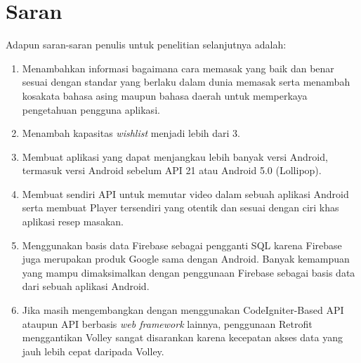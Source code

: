 \section{Saran}
	Adapun saran-saran penulis untuk penelitian selanjutnya adalah:
	\begin{enumerate}
		\item Menambahkan informasi bagaimana cara memasak yang baik dan benar sesuai dengan standar yang berlaku dalam dunia memasak serta menambah kosakata bahasa asing maupun bahasa daerah untuk memperkaya pengetahuan pengguna aplikasi. 
		
		\item Menambah kapasitas \textit{wishlist} menjadi lebih dari 3.
		
		\item Membuat aplikasi yang dapat menjangkau lebih banyak versi Android, termasuk versi Android sebelum API 21 atau Android 5.0 (Lollipop). 
		
		\item Membuat sendiri API untuk memutar video dalam sebuah aplikasi Android serta membuat Player tersendiri yang otentik dan sesuai dengan ciri khas aplikasi resep masakan.
		
		\item Menggunakan basis data Firebase sebagai pengganti SQL karena Firebase juga merupakan produk Google sama dengan Android. Banyak kemampuan yang mampu dimaksimalkan dengan penggunaan Firebase sebagai basis data dari sebuah aplikasi Android.
		
		\item Jika masih mengembangkan dengan menggunakan CodeIgniter-Based API ataupun API berbasis \textit{web framework} lainnya, penggunaan Retrofit menggantikan Volley sangat disarankan karena kecepatan akses data yang jauh lebih cepat daripada Volley. 

	\end{enumerate}

	
\begin{comment}

\end{comment}
